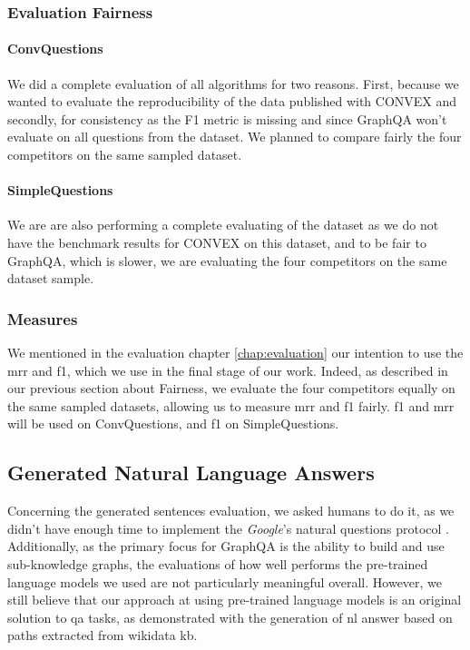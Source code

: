 \subsubsection{Evaluation Fairness}
\paragraph{ConvQuestions}
We did a complete evaluation of all algorithms for two reasons. First, because we wanted to evaluate the reproducibility of the data published with CONVEX \autocite{paper:convex} and secondly, for consistency as the F1 metric is missing and since GraphQA won't evaluate on all questions from the dataset. We planned to compare fairly the four competitors on the same sampled dataset.

\paragraph{SimpleQuestions}
We are are also performing a complete evaluating of the dataset as we do not have the benchmark results for CONVEX on this dataset, and to be fair to GraphQA, which is slower, we are evaluating the four competitors on the same dataset sample.

\subsubsection{Measures}
We mentioned in the evaluation chapter \ref{chap:evaluation} our intention to use the \gls{mrr} and \gls{f1}, which we use in the final stage of our work. Indeed, as described in our previous section about Fairness, we evaluate the four competitors equally on the same sampled datasets, allowing us to measure \gls{mrr} and \gls{f1} fairly. \gls{f1} and \gls{mrr} will be used on ConvQuestions, and \gls{f1} on SimpleQuestions. 

\subsection{Generated Natural Language Answers}
Concerning the generated sentences evaluation, we asked humans to do it, as we didn't have enough time to implement the \textit{Google}'s natural questions protocol \autocite{paper:google-natural-questions}. Additionally, as the primary focus for GraphQA is the ability to build and use sub-knowledge graphs, the evaluations of how well performs the pre-trained language models we used are not particularly meaningful overall. However, we still believe that our approach at using pre-trained language models is an original solution to \gls{qa} tasks, as demonstrated with the generation of \gls{nl} answer based on paths extracted from \gls{wikidata} \gls{kb}.

